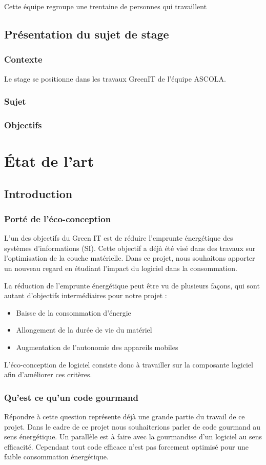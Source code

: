 \documentclass[a4paper, 11pt]{report}
\begin{document}
Cette équipe regroupe une trentaine de personnes qui travaillent 
\section{Présentation du sujet de stage}
\subsection{Contexte}
Le stage se positionne dans les travaux GreenIT de l’équipe ASCOLA.
\subsection{Sujet}

\subsection{Objectifs}

\chapter{État de l'art}
\section{Introduction}
\subsection{Porté de l'éco-conception}
L’un des objectifs du Green IT est de réduire l’emprunte énergétique des systèmes d’informations (SI). Cette objectif a déjà été visé dans des travaux sur l'optimisation de la couche matérielle. Dans ce projet, nous souhaitons apporter un nouveau regard en étudiant l’impact du logiciel dans la consommation.

La réduction de l’emprunte énergétique peut être vu de plusieurs façons, qui sont autant d’objectifs intermédiaires pour notre projet :
\begin{itemize}
	\item Baisse de la consommation d’énergie
	\item Allongement de la durée de vie du matériel
	\item Augmentation de l’autonomie des appareils mobiles
\end{itemize}

L’éco-conception de logiciel consiste donc à travailler sur la composante logiciel afin d’améliorer ces critères.

\subsection{Qu'est ce qu'un code gourmand}
Répondre à cette question représente déjà une grande partie du travail de ce projet. Dans le cadre de ce projet nous souhaiterions parler de code gourmand au sens énergétique. Un parallèle est à faire avec la gourmandise d’un logiciel au sens efficacité. Cependant tout code efficace n’est pas forcement optimisé pour une faible consommation énergétique.
\end{document}
